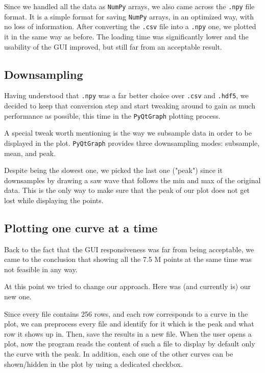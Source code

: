 \documentclass[11pt,a4paper]{article}
\begin{document}
Since we handled all the data as \texttt{NumPy} arrays, we also came across the \texttt{.npy} file format. It is a simple format for saving \texttt{NumPy} arrays, in an optimized way, with no loss of information.
After converting the \texttt{.csv} file into a \texttt{.npy} one, we plotted it in the same way as before. The loading time was significantly lower and the usability of the GUI improved, but still far from an acceptable result.\\

\subsection{Downsampling}

Having understood that \texttt{.npy} was a far better choice over \texttt{.csv} and \texttt{.hdf5}, we decided to keep that conversion step and start tweaking around to gain as much performance as possible, this time in the \texttt{PyQtGraph} plotting process.

A special tweak worth mentioning is the way we subsample data in order to be displayed in the plot.
\texttt{PyQtGraph} provides three downsampling modes: subsample, mean, and peak.

Despite being the slowest one, we picked the last one ("peak") since it downsamples by drawing a saw wave that follows the min and max of the original data. This is the only way to make sure that the peak of our plot does not get lost while displaying the points.\\

\subsection{Plotting one curve at a time}

Back to the fact that the GUI responsiveness was far from being acceptable, we came to the conclusion that showing all the 7.5 M points at the same time was not feasible in any way.

At this point we tried to change our approach. Here was (and currently is) our new one.

Since every file contains 256 rows, and each row corresponds to a curve in the plot, we can preprocess every file and identify for it which is the peak and what row it shows up in. Then, save the results in a new file.
When the user opens a plot, now the program reads the content of such a file to display by default only the curve with the peak. In addition, each one of the other curves can be shown/hidden in the plot by using a dedicated checkbox.\\
\end{document}
